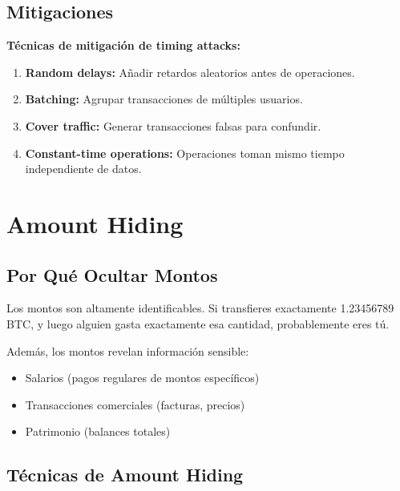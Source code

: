 \documentclass[11pt,a4paper,twoside]{book}
\begin{document}
\subsection{Mitigaciones}

\begin{keyidea}
\textbf{T\'ecnicas de mitigaci\'on de timing attacks:}

\begin{enumerate}
    \item \textbf{Random delays:} A\~nadir retardos aleatorios antes de operaciones.
    
    \item \textbf{Batching:} Agrupar transacciones de m\'ultiples usuarios.
    
    \item \textbf{Cover traffic:} Generar transacciones falsas para confundir.
    
    \item \textbf{Constant-time operations:} Operaciones toman mismo tiempo independiente de datos.
\end{enumerate}
\end{keyidea}

\section{Amount Hiding}
\label{sec:amount-hiding}

\subsection{Por Qu\'e Ocultar Montos}

\begin{intuicion}
Los montos son altamente identificables. Si transfieres exactamente 1.23456789 BTC, y luego alguien gasta exactamente esa cantidad, probablemente eres t\'u.

Adem\'as, los montos revelan informaci\'on sensible:
\begin{itemize}
    \item Salarios (pagos regulares de montos espec\'ificos)
    \item Transacciones comerciales (facturas, precios)
    \item Patrimonio (balances totales)
\end{itemize}
\end{intuicion}

\subsection{T\'ecnicas de Amount Hiding}
\end{document}
